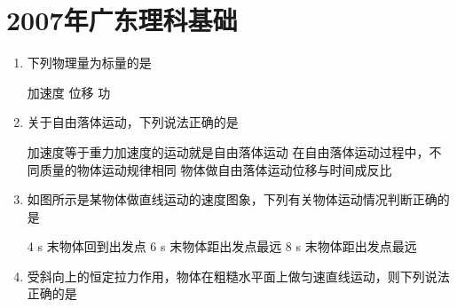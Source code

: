 \documentclass[\gkver]{gaokaozhenti}
\begin{document}
\chapter{2007年广东理科基础}

\begin{enumerate}
\item
下列物理量为标量的是

{加速度}
{位移}
{功}


\item
关于自由落体运动，下列说法正确的是

{加速度等于重力加速度的运动就是自由落体运动}
{在自由落体运动过程中，不同质量的物体运动规律相同}
{物体做自由落体运动位移与时间成反比}


\item
如图所示是某物体做直线运动的速度图象，下列有关物体运动情况判断正确的是


{4 s 末物体回到出发点}
{6 s 末物体距出发点最远}
{8 s 末物体距出发点最远}


\item
受斜向上的恒定拉力作用，物体在粗糙水平面上做匀速直线运动，则下列说法正确的是


\end{enumerate}
\end{document}
